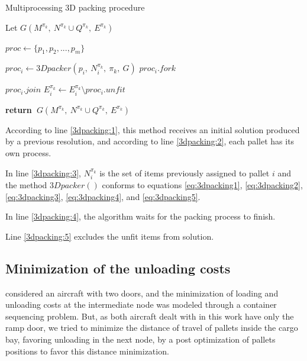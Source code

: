 \documentclass[preprint,authoryear]{elsarticle}
\renewcommand{\Return}{\State \bf {return}~}
\begin{document}
\begin{algorithm}[H]
	\caption{Multiprocessing 3D packing procedure}  \label{alg:3dpacking}
	
	\begin{algorithmic}[1]
		
		
		\State Let $G(M^{\pi_k},\ N^{\pi_k} \cup Q^{\pi_k},\ E^{\pi_k})$ \label{3dpacking:1}
		
		\State $proc \gets \{p_1,p_2,..., p_m\}$ \label{3dpacking:2} 
		
		\State $proc_i \gets 3Dpacker(p_i,\ N^{\pi_k}_i,\ \pi_k,\ G )$   \label{3dpacking:3}
		\State $proc_i.fork$ 
		\EndFor
		
		\State $proc_i.join$ \label{3dpacking:4}
		\State $E^{\pi_k}_i \gets E^{\pi_k}_i \setminus proc_i.unfit$  \label{3dpacking:5} 
		\EndFor
		
		\Return $G(M^{\pi_k},\ N^{\pi_k} \cup Q^{\pi_k},\ E^{\pi_k})$
		
		\EndProcedure
		
	\end{algorithmic}
\end{algorithm}

According to line \ref{3dpacking:1}, this method receives an initial solution produced by a previous resolution, and according to line \ref{3dpacking:2}, each pallet has its own process.

In line \ref{3dpacking:3}, $N^{\pi_k}_i$ is the set of items previously assigned to pallet $i$ and the method $3Dpacker()$ conforms to equations \ref{eq:3dpacking1}, \ref{eq:3dpacking2}, \ref{eq:3dpacking3}, \ref{eq:3dpacking4}, and \ref{eq:3dpacking5}.

In line \ref{3dpacking:4}, the algorithm waits for the packing process to finish.

Line \ref{3dpacking:5} excludes the unfit items from solution.


\subsection{Minimization of the unloading costs}

\cite{LurkinSchyns2015} considered an aircraft with two doors, and the minimization of loading and unloading costs at the intermediate node was modeled through a container sequencing problem. But, as both aircraft dealt with in this work have only the ramp door, we tried to minimize the distance of travel of pallets inside the cargo bay, favoring unloading in the next node, by a post optimization of pallets positions to favor this distance minimization.
\end{document}
